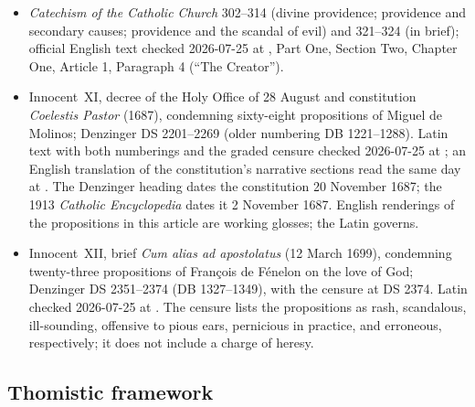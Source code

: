{\fontsize{8.6}{9.6}\selectfont
\begin{itemize}[itemsep=0pt,parsep=0pt,topsep=0.05em]
\item \emph{Catechism of the Catholic Church} 302--314 (divine providence; providence and secondary causes; providence and the scandal of evil) and 321--324 (in brief); official English text checked 2026-07-25 at , Part One, Section Two, Chapter One, Article 1, Paragraph 4 (``The Creator'').
\item Innocent~XI, decree of the Holy Office of 28 August and constitution \emph{Coelestis Pastor} (1687), condemning sixty-eight propositions of Miguel de Molinos; Denzinger DS 2201--2269 (older numbering DB 1221--1288). Latin text with both numberings and the graded censure checked 2026-07-25 at ; an English translation of the constitution's narrative sections read the same day at . The Denzinger heading dates the constitution 20 November 1687; the 1913 \emph{Catholic Encyclopedia} dates it 2 November 1687. English renderings of the propositions in this article are working glosses; the Latin governs.
\item Innocent~XII, brief \emph{Cum alias ad apostolatus} (12 March 1699), condemning twenty-three propositions of François de Fénelon on the love of God; Denzinger DS 2351--2374 (DB 1327--1349), with the censure at DS 2374. Latin checked 2026-07-25 at . The censure lists the propositions as rash, scandalous, ill-sounding, offensive to pious ears, pernicious in practice, and erroneous, respectively; it does not include a charge of heresy.
\end{itemize}}

\subsection*{Thomistic framework}

